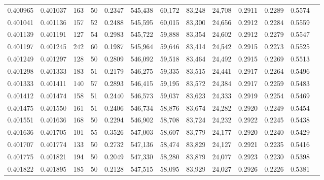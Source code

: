 \begin{tabular}{rrrrrrrrrrrrr}
0.400965 & 0.401037 &   163 &  50 &                                     0.2347 & 545,438 &  60,172 &  83,248 &  24,708 & 0.2911 & 0.2289 & 0.5574 \\
0.401041 & 0.401136 &   157 &  52 &                                     0.2488 & 545,595 &  60,015 &  83,300 &  24,656 & 0.2912 & 0.2284 & 0.5559 \\
0.401139 & 0.401191 &   127 &  54 &                                     0.2983 & 545,722 &  59,888 &  83,354 &  24,602 & 0.2912 & 0.2279 & 0.5547 \\
0.401197 & 0.401245 &   242 &  60 &                                     0.1987 & 545,964 &  59,646 &  83,414 &  24,542 & 0.2915 & 0.2273 & 0.5525 \\
0.401249 & 0.401297 &   128 &  50 &                                     0.2809 & 546,092 &  59,518 &  83,464 &  24,492 & 0.2915 & 0.2269 & 0.5513 \\
0.401298 & 0.401333 &   183 &  51 &                                     0.2179 & 546,275 &  59,335 &  83,515 &  24,441 & 0.2917 & 0.2264 & 0.5496 \\
0.401333 & 0.401411 &   140 &  57 &                                     0.2893 & 546,415 &  59,195 &  83,572 &  24,384 & 0.2917 & 0.2259 & 0.5483 \\
0.401412 & 0.401474 &   158 &  51 &                                     0.2440 & 546,573 &  59,037 &  83,623 &  24,333 & 0.2919 & 0.2254 & 0.5469 \\
0.401475 & 0.401550 &   161 &  51 &                                     0.2406 & 546,734 &  58,876 &  83,674 &  24,282 & 0.2920 & 0.2249 & 0.5454 \\
0.401551 & 0.401636 &   168 &  50 &                                     0.2294 & 546,902 &  58,708 &  83,724 &  24,232 & 0.2922 & 0.2245 & 0.5438 \\
0.401636 & 0.401705 &   101 &  55 &                                     0.3526 & 547,003 &  58,607 &  83,779 &  24,177 & 0.2920 & 0.2240 & 0.5429 \\
0.401707 & 0.401774 &   133 &  50 &                                     0.2732 & 547,136 &  58,474 &  83,829 &  24,127 & 0.2921 & 0.2235 & 0.5416 \\
0.401775 & 0.401821 &   194 &  50 &                                     0.2049 & 547,330 &  58,280 &  83,879 &  24,077 & 0.2923 & 0.2230 & 0.5398 \\
0.401822 & 0.401895 &   185 &  50 &                                     0.2128 & 547,515 &  58,095 &  83,929 &  24,027 & 0.2926 & 0.2226 & 0.5381 \\

\end{tabular}
